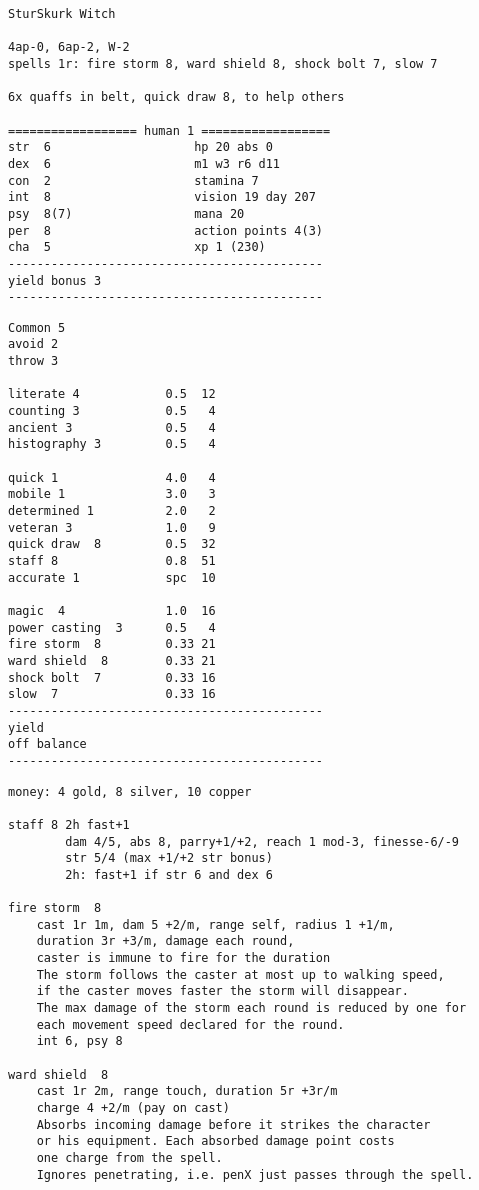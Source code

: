 \begin{verbatim}
\end{verbatim} \pagebreak[2] \begin{verbatim}
SturSkurk Witch

4ap-0, 6ap-2, W-2
spells 1r: fire storm 8, ward shield 8, shock bolt 7, slow 7

6x quaffs in belt, quick draw 8, to help others

================== human 1 ==================
str  6                    hp 20 abs 0
dex  6                    m1 w3 r6 d11
con  2                    stamina 7
int  8                    vision 19 day 207
psy  8(7)                 mana 20
per  8                    action points 4(3)
cha  5                    xp 1 (230)
--------------------------------------------
yield bonus 3
--------------------------------------------
\end{verbatim} \goodbreak \begin{verbatim}
Common 5
avoid 2
throw 3

literate 4            0.5  12
counting 3            0.5   4
ancient 3             0.5   4
histography 3         0.5   4

quick 1               4.0   4
mobile 1              3.0   3
determined 1          2.0   2
veteran 3             1.0   9
quick draw  8         0.5  32
staff 8               0.8  51
accurate 1            spc  10

magic  4              1.0  16
power casting  3      0.5   4
fire storm  8         0.33 21
ward shield  8        0.33 21
shock bolt  7         0.33 16
slow  7               0.33 16
--------------------------------------------
yield
off balance
--------------------------------------------
\end{verbatim} \goodbreak \begin{verbatim}
money: 4 gold, 8 silver, 10 copper

staff 8 2h fast+1
        dam 4/5, abs 8, parry+1/+2, reach 1 mod-3, finesse-6/-9
        str 5/4 (max +1/+2 str bonus)
        2h: fast+1 if str 6 and dex 6

fire storm  8
    cast 1r 1m, dam 5 +2/m, range self, radius 1 +1/m,
    duration 3r +3/m, damage each round,
    caster is immune to fire for the duration
    The storm follows the caster at most up to walking speed,
    if the caster moves faster the storm will disappear.
    The max damage of the storm each round is reduced by one for
    each movement speed declared for the round.
    int 6, psy 8

ward shield  8
    cast 1r 2m, range touch, duration 5r +3r/m
    charge 4 +2/m (pay on cast)
    Absorbs incoming damage before it strikes the character
    or his equipment. Each absorbed damage point costs
    one charge from the spell.
    Ignores penetrating, i.e. penX just passes through the spell.


\end{verbatim}
